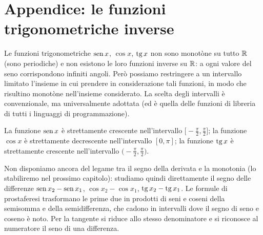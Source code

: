 \section{Appendice: le funzioni trigonometriche inverse}
\label{sec:trig-inverse}

Le funzioni trigonometriche $\operatorname{sen} x$, $\cos x$, $\operatorname{tg} x$ non sono monotòne su tutto $\mathbb{R}$ (sono
periodiche) e non esistono le loro funzioni inverse su $\mathbb{R}$: a ogni valore del seno
corrispondono infiniti angoli. Però possiamo restringere a un intervallo limitato
l'insieme in cui prendere in considerazione tali funzioni, in modo che risultino monotòne
nell'insieme considerato. La scelta degli intervalli è convenzionale, ma universalmente
adottata (ed è quella delle funzioni di libreria di tutti i linguaggi di programmazione).

\begin{lemma}\label{lem:monotonia-trig}
La funzione $\operatorname{sen} x$ è strettamente crescente nell'intervallo
$\bigl[-\frac\pi2,\frac\pi2\bigr]$; la funzione $\cos x$ è strettamente decrescente
nell'intervallo $[0,\pi]$; la funzione $\operatorname{tg} x$ è strettamente crescente nell'intervallo
$\bigl(-\frac\pi2,\frac\pi2\bigr)$.
\end{lemma}

\begin{schema}
\end{schema}

\begin{strategia}
Non disponiamo ancora del legame tra il segno della derivata e la monotonia (lo
stabiliremo nel prossimo capitolo): studiamo quindi direttamente il segno delle
differenze $\operatorname{sen} x_{2}-\operatorname{sen} x_{1}$, $\cos x_{2}-\cos x_{1}$, $\operatorname{tg} x_{2}-\operatorname{tg} x_{1}$. Le
formule di prostaferesi trasformano le prime due in prodotti di seni e coseni della
semisomma e della semidifferenza, che cadono in intervalli dove il segno di seno e coseno
è noto. Per la tangente si riduce allo stesso denominatore e si riconosce al numeratore il
seno di una differenza.
\end{strategia}

